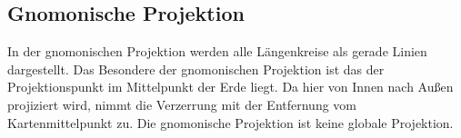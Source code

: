 \subsection{Gnomonische Projektion}
\label{sec:gnomic}
In der gnomonischen Projektion werden alle Längenkreise als gerade Linien dargestellt.
Das Besondere der gnomonischen Projektion ist das der Projektionspunkt im Mittelpunkt der Erde liegt.
Da hier von Innen nach Außen projiziert wird, nimmt die Verzerrung mit der Entfernung vom Kartenmittelpunkt zu. Die gnomonische Projektion ist keine globale Projektion.
